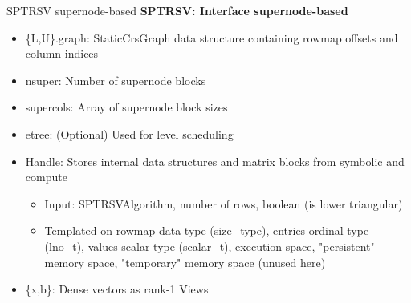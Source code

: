 \begin{frame}[fragile]{SPTRSV supernode-based}
\textbf{SPTRSV: Interface supernode-based}

  \begin{itemize}
    \item \{L,U\}.graph: StaticCrsGraph data structure containing rowmap offsets and column indices
    \item nsuper: Number of supernode blocks
    \item supercols: Array of supernode block sizes
    \item etree: (Optional) Used for level scheduling
    \item Handle: Stores internal data structures and matrix blocks from symbolic and compute
    \begin{itemize}
      \item Input: SPTRSVAlgorithm, number of rows, boolean (is lower triangular)
      \item Templated on rowmap data type (size\_type), entries ordinal type (lno\_t), values scalar type (scalar\_t), execution space, "persistent" memory space, "temporary" memory space (unused here)
    \end{itemize}
    \item \{x,b\}: Dense vectors as rank-1 Views
  \end{itemize}
\end{frame}

